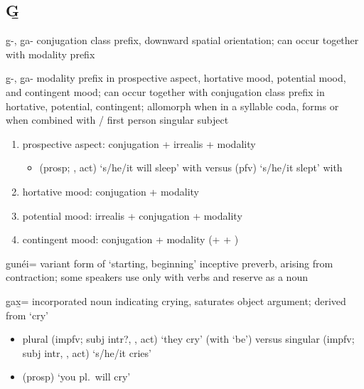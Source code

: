 \documentclass[12pt,letterpaper,oneside,article]{memoir}
\begin{document}
\subsection{G̱}\label{sec:alphalist-gh}
\begin{morphdesc}[resume*=alphalist]
\item[g̱-, g̱a-]
	 conjugation class prefix, downward spatial orientation;
	can occur together with  modality prefix

\item[g̱-, g̱a-]
	modality prefix in prospective aspect,
		hortative mood,
		potential mood,
		and contingent mood;
	can occur together with  conjugation class prefix in hortative, potential, contingent;
	allomorph  when in a syllable coda,
		forms  or  when combined with  /  first person singular subject
	\begin{enumerate}
	\item	prospective aspect:  conjugation +  irrealis +  modality
		\begin{itemize}
		\item	{} (prosp; ,  act) ‘s/he/it will sleep’
				with \newline
			versus  (pfv) ‘s/he/it slept’
				with 
		\end{itemize}
	\item	hortative mood:  conjugation +  modality
	\item	potential mood:  irrealis +  conjugation +  modality
	\item	contingent mood:  conjugation +  modality (+  + )
	\end{enumerate}

\item[g̱unéi=]
	variant form of  ‘starting, beginning’ inceptive preverb, arising from contraction;
	some speakers use only  with verbs and reserve  as a noun

\item[g̱ax̱=]
	incorporated noun indicating crying, saturates object argument;
	derived from  ‘cry’
	\begin{itemize}
	\item	plural  (impfv; subj intr?, ,  act) ‘they cry’ (with  ‘be’)\newline
		versus singular  (impfv; subj intr, ,  act) ‘s/he/it cries’
	\item	{} (prosp) ‘you pl.\ will cry’
		\parencite[60.683]{story-naish:1973}
	\end{itemize}


\end{morphdesc}
\end{document}
